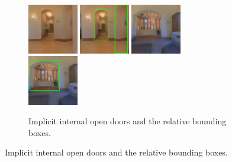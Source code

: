 \begin{figure}[h!]
	\centering
	\begin{subfigure}[b]{\linewidth}
		\centering
		\includegraphics[width=0.24\textwidth]{images/implicitdoor1.png}
		\hfill
		\includegraphics[width=0.24\textwidth]{images/implicitdoor1boxed.png}
		\hfill
		\includegraphics[width=0.24\textwidth]{images/implicitdoor2.png}
		\hfill
		\includegraphics[width=0.24\textwidth]{images/implicitdoor2boxed.png}
		\caption{Implicit internal open doors and the relative bounding boxes.}
	\end{subfigure}
	

\end{figure}
